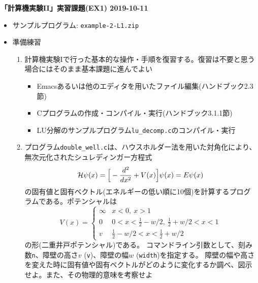\documentclass[11pt]{jarticle}
\begin{document}
\noindent
{\bf\large 「計算機実験II」実習課題(EX1) 2019-10-11}
\\[-0.5em]

\noindent
\begin{itemize}
\item サンプルプログラム: {\verb+example-2-L1.zip+}

\item 準備練習

  \begin{enumerate}
    \item 計算機実験Iで行った基本的な操作・手順を復習する。復習は不要と思う場合にはそのまま基本課題に進んでよい
      \begin{itemize}
      \item Emacsあるいは他のエディタを用いたファイル編集(ハンドブック2.3節)
      \item Cプログラムの作成・コンパイル・実行(ハンドブック3.1.1節)
      \item LU分解のサンプルプログラム{\tt lu\_decomp.c}のコンパイル・実行
      \end{itemize}
    \item プログラム{\tt double\_well.c}は、ハウスホルダー法を用いた対角化により、無次元化されたシュレディンガー方程式
    \begin{equation*}
      {\cal H} \psi(x) = \Big[ -\frac{d^2}{dx^2} + V(x) \Big] \psi(x) = E \psi(x)
    \end{equation*}
    の固有値と固有ベクトル(エネルギーの低い順に10個)を計算するプログラムである。ポテンシャルは
    \begin{equation*}
      V(x) = \begin{cases}
        \infty & x < 0, \ x > 1 \\
        0 & 0 < x < \frac{1}{2} - w/2, \ \frac{1}{2} + w/2 < x < 1 \\
        v & \frac{1}{2} - w/2 < x < \frac{1}{2} + w/2
      \end{cases}
    \end{equation*}
    の形(二重井戸ポテンシャル)である。
    コマンドライン引数として、刻み数{\tt n}、障壁の高さ$v$ ({\tt v})、障壁の幅$w$ ({\tt width})を指定する。
    障壁の幅や高さを変えた時に固有値や固有ベクトルがどのように変化するか調べ、図示せよ。また、その物理的意味を考察せよ
  \end{enumerate}


\end{itemize}
\end{document}
